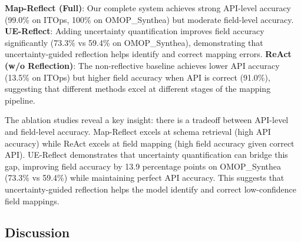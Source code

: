 \documentclass[sigconf, nonacm]{acmart}
\newcommand{\deleted}[1]{\textcolor{red}{#1}}
\begin{document}
\textbf{Map-Reflect (Full)}: Our complete system achieves strong API-level accuracy (99.0\% on ITOps, 100\% on OMOP\_Synthea) but moderate field-level accuracy. \textbf{UE-Reflect}: Adding uncertainty quantification improves field accuracy significantly (73.3\% vs 59.4\% on OMOP\_Synthea), demonstrating that uncertainty-guided reflection helps identify and correct mapping errors. \textbf{ReAct (w/o Reflection)}: The non-reflective baseline achieves lower API accuracy (13.5\% on ITOps) but higher field accuracy when API is correct (91.0\%), suggesting that different methods excel at different stages of the mapping pipeline.


The ablation studies reveal a key insight: there is a tradeoff between API-level and field-level accuracy. Map-Reflect excels at schema retrieval (high API accuracy) while ReAct excels at field mapping (high field accuracy given correct API). UE-Reflect demonstrates that uncertainty quantification can bridge this gap, improving field accuracy by 13.9 percentage points on OMOP\_Synthea (73.3\% vs 59.4\%) while maintaining perfect API accuracy. This suggests that uncertainty-guided reflection helps the model identify and correct low-confidence field mappings.


\subsection{Discussion}

\end{document}
